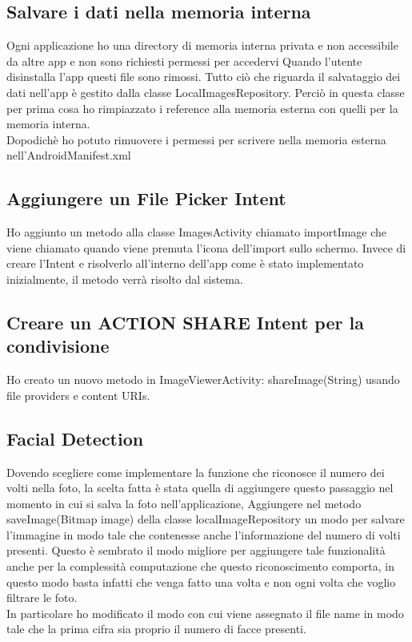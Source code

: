 \documentclass{article}
\begin{document}
\subsection{Salvare i dati nella memoria interna}
Ogni applicazione ho una directory di memoria interna privata e non accessibile da altre app e non sono richiesti permessi per accedervi Quando l'utente disinstalla l'app questi file sono rimossi.
Tutto ciò che riguarda il salvataggio dei dati nell'app è gestito dalla classe LocalImagesRepository.
Perciò in questa classe per prima cosa ho rimpiazzato i reference alla memoria esterna con quelli per la memoria interna.\\
Dopodichè ho potuto rimuovere i permessi per scrivere nella memoria esterna nell'AndroidManifest.xml
\subsection{Aggiungere un File Picker Intent}
Ho aggiunto un metodo alla classe ImagesActivity chiamato importImage che viene chiamato quando viene premuta l'icona dell'import sullo schermo. Invece di creare l'Intent e risolverlo all'interno dell'app come è stato implementato inizialmente, il metodo verrà risolto dal sistema.\\
\subsection{Creare un ACTION SHARE Intent per la condivisione}
Ho creato un nuovo metodo in ImageViewerActivity: shareImage(String) usando file providers e content URIs.
\subsection{Facial Detection}
Dovendo scegliere come implementare la funzione che riconosce il numero dei volti nella foto, la scelta fatta è stata quella di aggiungere questo passaggio nel momento in cui si salva la foto nell'applicazione, Aggiungere nel metodo saveImage(Bitmap image) della classe localImageRepository un modo per salvare l'immagine in modo tale che contenesse anche l'informazione del numero di volti presenti. Questo è sembrato il modo migliore per aggiungere tale funzionalità anche per la complessità computazione che questo riconoscimento comporta, in questo modo basta infatti che venga fatto una volta e non ogni volta che voglio filtrare le foto.\\
In particolare ho modificato il modo con cui viene assegnato il file name in modo tale che la prima cifra sia proprio il numero di facce presenti.
\end{document}

